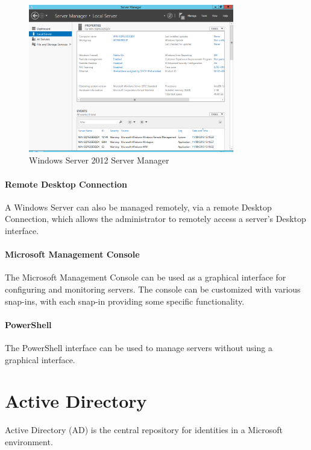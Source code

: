 \begin{figure}[h!]
	\centering
	\includegraphics[width=0.8\textwidth]{Schemas/servermanager.png}
	\caption{Windows Server 2012 Server Manager}
	\label{fig:ws_sm}
\end{figure}

\paragraph{Remote Desktop Connection}
A Windows Server can also be managed remotely, via a remote Desktop Connection, which allows the administrator to remotely access a server's Desktop interface.

\paragraph{Microsoft Management Console}
The Microsoft Management Console can be used as a graphical interface for configuring and monitoring servers. The console can be customized with various snap-ins, with each snap-in providing some specific functionality.

\paragraph{PowerShell}
The PowerShell interface can be used to manage servers without using a graphical interface.


\section{Active Directory}

Active Directory (AD) is the central repository for identities in a Microsoft environment.

